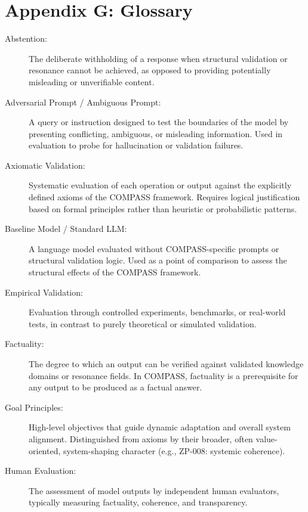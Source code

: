 \section*{Appendix G: Glossary}

\begin{description}

\item[Abstention:]  
The deliberate withholding of a response when structural validation or resonance cannot be achieved, as opposed to providing potentially misleading or unverifiable content.

\item[Adversarial Prompt / Ambiguous Prompt:]  
A query or instruction designed to test the boundaries of the model by presenting conflicting, ambiguous, or misleading information. Used in evaluation to probe for hallucination or validation failures.

\item[Axiomatic Validation:]  
Systematic evaluation of each operation or output against the explicitly defined axioms of the COMPASS framework. Requires logical justification based on formal principles rather than heuristic or probabilistic patterns.

\item[Baseline Model / Standard LLM:]  
A language model evaluated without COMPASS-specific prompts or structural validation logic. Used as a point of comparison to assess the structural effects of the COMPASS framework.

\item[Empirical Validation:]  
Evaluation through controlled experiments, benchmarks, or real-world tests, in contrast to purely theoretical or simulated validation.

\item[Factuality:]  
The degree to which an output can be verified against validated knowledge domains or resonance fields. In COMPASS, factuality is a prerequisite for any output to be produced as a factual answer.

\item[Goal Principles:]  
High-level objectives that guide dynamic adaptation and overall system alignment. Distinguished from axioms by their broader, often value-oriented, system-shaping character (e.g., ZP-008: systemic coherence).

\item[Human Evaluation:]  
The assessment of model outputs by independent human evaluators, typically measuring factuality, coherence, and transparency.


\end{description}
